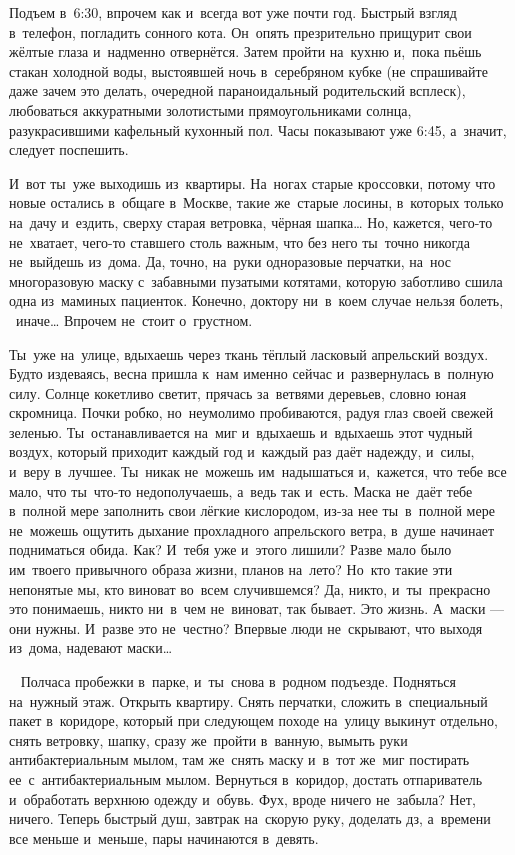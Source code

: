 \chap{***
} 
Подъем в~6:30, впрочем как и~всегда вот уже почти год.
Быстрый взгляд в~телефон, погладить сонного кота.
Он~опять презрительно прищурит свои жёлтые глаза и~надменно отвернётся.
Затем пройти на~кухню и,~пока пьёшь стакан холодной воды, выстоявшей ночь в~серебряном кубке (не спрашивайте даже зачем это делать, очередной параноидальный родительский всплеск), любоваться аккуратными золотистыми прямоугольниками солнца, разукрасившими кафельный кухонный пол.
Часы показывают уже 6:45, а~значит, следует поспешить.

И~вот ты~уже выходишь из~квартиры.
На~ногах старые кроссовки, потому что новые остались в~общаге в~Москве, такие же~старые лосины, в~которых только на~дачу и~ездить, сверху старая ветровка, чёрная шапка… Но, кажется, чего-то не~хватает, чего-то ставшего столь важным, что без него ты~точно никогда не~выйдешь из~дома.
Да, точно, на~руки одноразовые перчатки, на~нос многоразовую маску с~забавными пузатыми котятами, которую заботливо сшила одна из~маминых пациенток.
Конечно, доктору ни~в~коем случае нельзя болеть, ~иначе… Впрочем не~стоит о~грустном.

Ты~уже на~улице, вдыхаешь через ткань тёплый ласковый апрельский воздух.
Будто издеваясь, весна пришла к~нам именно сейчас и~развернулась в~полную силу.
Солнце кокетливо светит, прячась за~ветвями деревьев, словно юная скромница.
Почки робко, но~неумолимо пробиваются, радуя глаз своей свежей зеленью.
Ты~останавливается на~миг и~вдыхаешь и~вдыхаешь этот чудный воздух, который приходит каждый год и~каждый раз даёт надежду, и~силы, и~веру в~лучшее.
Ты~никак не~можешь им~надышаться и,~кажется, что тебе все мало, что ты~что-то недополучаешь, а~ведь так и~есть.
Маска не~даёт тебе в~полной мере заполнить свои лёгкие кислородом, из-за нее ты~в~полной мере не~можешь ощутить дыхание прохладного апрельского ветра, в~душе начинает подниматься обида.
Как? И~тебя уже и~этого лишили? Разве мало было им~твоего привычного образа жизни, планов на~лето? Но~кто такие эти непонятые мы, кто виноват во~всем случившемся? Да, никто, и~ты~прекрасно это понимаешь, никто ни~в~чем не~виноват, так бывает.
Это жизнь.
А~маски --- они нужны.
И~разве это не~честно? Впервые люди не~скрывают, что выходя из~дома, надевают маски…
 

~
Полчаса пробежки в~парке, и~ты~снова в~родном подъезде.
Подняться на~нужный этаж.
Открыть квартиру.
Снять перчатки, сложить в~специальный пакет в~коридоре, который при следующем походе на~улицу выкинут отдельно, снять ветровку, шапку, сразу же~пройти в~ванную, вымыть руки антибактериальным мылом, там же~снять маску и~в~тот же~миг постирать ее~с~антибактериальным мылом.
Вернуться в~коридор, достать отпариватель и~обработать верхнюю одежду и~обувь.
Фух, вроде ничего не~забыла? Нет, ничего.
Теперь быстрый душ, завтрак на~скорую руку, доделать дз, а~времени все меньше и~меньше, пары начинаются в~девять.
 

